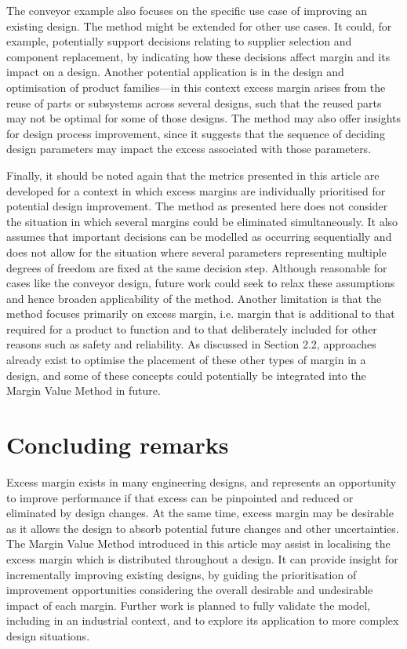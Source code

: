 The conveyor example also focuses on the specific use case of improving an existing design.  The method might be extended for other use cases. It could, for example, potentially support decisions relating to supplier selection and component replacement, by indicating how these decisions affect margin and its impact on a design. Another potential application is in the design and optimisation of product families---in this context excess margin arises from the reuse of parts or subsystems across several designs, such that the reused parts may not be optimal for some of those designs. The method may also offer insights for design process improvement, since it suggests that the sequence of deciding design parameters may impact the excess associated with those parameters.

Finally, it should be noted again that the metrics presented in this article are developed for a context in which excess margins are individually prioritised for potential design improvement. The method as presented here does not consider the situation in which several margins could be eliminated simultaneously. It also assumes that important decisions can be modelled as occurring sequentially and does not allow for the situation where several parameters representing multiple degrees of freedom are fixed at the same decision step. Although reasonable for cases like the conveyor design, future work could seek to relax these assumptions and hence broaden applicability of the method. Another limitation is that the method focuses primarily on excess margin, i.e. margin that is additional to that required for a product to function and to that deliberately included for other reasons such as safety and reliability. As discussed in Section 2.2, approaches already exist to optimise the placement of these other types of margin in a design, and some of these concepts could potentially be integrated into the Margin Value Method in future.

\section{Concluding remarks}\label{conclusion}

Excess margin exists in many engineering designs, and represents an opportunity to improve performance if that excess can be pinpointed and reduced or eliminated by design changes. At the same time, excess margin may be desirable as it allows the design to absorb potential future changes and other uncertainties. The Margin Value Method introduced in this article may assist in localising the excess margin which is distributed throughout a design. It can provide insight for incrementally improving existing designs, by guiding the prioritisation of improvement opportunities considering the overall desirable and undesirable impact of each margin. Further work is planned to fully validate the model, including in an industrial context, and to explore its application to more complex design situations.


